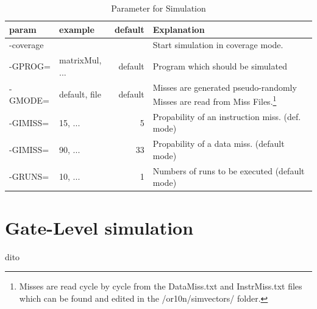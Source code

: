\begin{savenotes}
\begin{table}[htbp]
 \caption{Parameter for Simulation}
 \label{tab:param}
 \centering\begin{tabular}{|l|p{2cm}|r|p{8cm}|} \hline
param & example & default & Explanation \\ \hline
-coverage & &  & Start simulation in coverage mode. \\ \hline
-GPROG= & matrixMul, ... & default & Program which should be simulated \\ \hline
-GMODE= & default, \newline file & default & Misses are generated pseudo-randomly \newline Misses are read from Miss Files.\footnote{Misses are read cycle by cycle from the DataMiss.txt and InstrMiss.txt files which can be found and edited in the /or10n/simvectors/ folder.} \\ \hline
-GIMISS= & 15, ... & 5 & Propability of an instruction miss. (def. mode) \\ \hline
-GIMISS= & 90, ... & 33 & Propability of a data miss. (default mode) \\ \hline
-GRUNS= & 10, ... & 1 & Numbers of runs to be executed (default mode) \\ \hline
\end{tabular}
\end{table}
\end{savenotes}


\section{Gate-Level simulation}
dito








